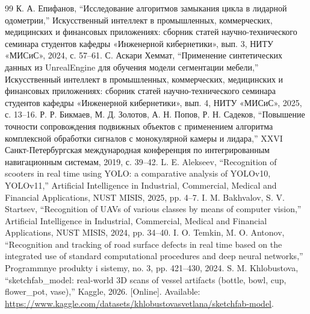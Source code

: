 \documentclass{misisarticle}
\begin{document}
\begin{thebibliography}{99}
 К. А. Епифанов, ``Исследование алгоритмов замыкания цикла в лидарной одометрии,'' Искусственный интеллект в промышленных, коммерческих, медицинских и финансовых приложениях: сборник статей научно-технического семинара студентов кафедры «Инженерной кибернетики», вып. 3, НИТУ «МИСиС», 2024, с. 57--61.
 С. Аскари Хеммат, ``Применение синтетических данных из UnrealEngine для обучения модели сегментации мебели,'' Искусственный интеллект в промышленных, коммерческих, медицинских и финансовых приложениях: сборник статей научно-технического семинара студентов кафедры «Инженерной кибернетики», вып. 4, НИТУ «МИСиС», 2025, с. 13--16.
 Р. Р. Бикмаев, М. Д. Золотов, А. Н. Попов, Р. Н. Садеков, ``Повышение точности сопровождения подвижных объектов с применением алгоритма комплексной обработки сигналов с монокулярной камеры и лидара,'' XXVI Санкт-Петербургская международная конференция по интегрированным навигационным системам, 2019, с. 39--42.
 L. E. Alekseev, ``Recognition of scooters in real time using YOLO: a comparative analysis of YOLOv10, YOLOv11,'' Artificial Intelligence in Industrial, Commercial, Medical and Financial Applications, NUST MISIS, 2025, pp. 4--7.
 I. M. Bakhvalov, S. V. Startsev, ``Recognition of UAVs of various classes by means of computer vision,'' Artificial Intelligence in Industrial, Commercial, Medical and Financial Applications, NUST MISIS, 2024, pp. 34--40.
 I. O. Temkin, M. O. Antonov, ``Recognition and tracking of road surface defects in real time based on the integrated use of standard computational procedures and deep neural networks,'' Programmnye produkty i sistemy, no. 3, pp. 421--430, 2024.
 S. M. Khlobustova, ``sketchfab\_model: real-world 3D scans of vessel artifacts (bottle, bowl, cup, flower\_pot, vase),'' Kaggle, 2026. [Online]. Available: \url{https://www.kaggle.com/datasets/khlobustovasvetlana/sketchfab-model}.
\end{thebibliography}
\end{document}

